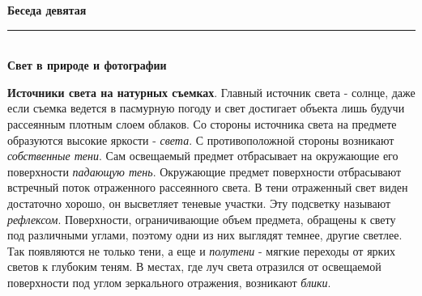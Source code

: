 \documentclass{article}
\newcommand{\important}[1]{\textbf{#1}}
\renewcommand{\section}[2]{
	\vspace{6em}
	\begin{flushright}
		\Large
		\baselineskip=0.5\baselineskip
		\textbf{#1}
		\\
		\rule[0.5\baselineskip]{\textwidth}{0.15pt}
		\\
		\textbf{#2}
	\end{flushright}
}
\begin{document}
\section{Беседа девятая}{Свет в природе и фотографии}
\important{Источники света на натурных съемках}. Главный источник света - солнце, даже если съемка ведется в пасмурную погоду и свет достигает объекта лишь будучи рассеянным плотным слоем облаков. Со стороны источника света на предмете образуются высокие яркости - \textit{света}. С противоположной стороны возникают \textit{собственные тени}. Сам освещаемый предмет отбрасывает на окружающие его поверхности \textit{падающую тень}. Окружающие предмет поверхности отбрасывают встречный поток отраженного рассеянного света. В тени отраженный свет виден достаточно хорошо, он высветляет теневые участки. Эту подсветку называют \textit{рефлексом}. Поверхности, ограничивающие объем предмета, обращены к свету под различными углами, поэтому одни из них выглядят темнее, другие светлее. Так появляются не только тени, а еще и \textit{полутени} - мягкие переходы от ярких светов к глубоким теням. В местах, где луч света отразился от освещаемой поверхности под углом зеркального отражения, возникают \textit{блики}.
\end{document}
